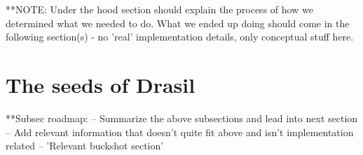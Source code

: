   **NOTE: Under the hood section should explain the process of how we determined
  what we needed to do. What we ended up doing should come in the following
  section(s) - no 'real' implementation details, only conceptual stuff here.
  
\section{The seeds of Drasil}
  **Subsec roadmap:
    -- Summarize the above subsections and lead into next section
    -- Add relevant information that doesn't quite fit above 
      and isn't implementation related
    -- 'Relevant buckshot section'